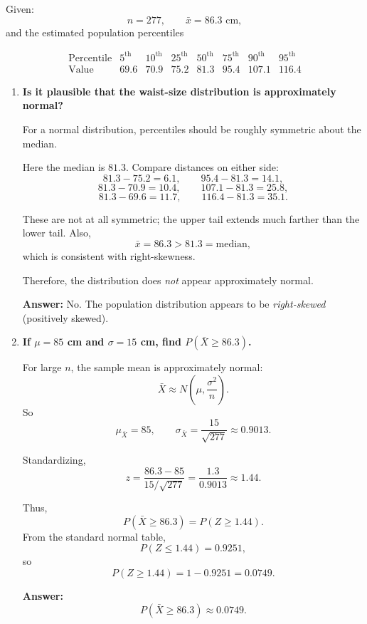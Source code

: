 Given:
\[
n=277,\qquad \bar{x}=86.3\text{ cm},
\]
and the estimated population percentiles

\[
\begin{array}{c|ccccccc}
\text{Percentile} & 5^\text{th} & 10^\text{th} & 25^\text{th} & 50^\text{th} & 75^\text{th} & 90^\text{th} & 95^\text{th}\\
\hline
\text{Value} & 69.6 & 70.9 & 75.2 & 81.3 & 95.4 & 107.1 & 116.4
\end{array}
\]

\begin{enumerate}
    \item[(a)] \textbf{Is it plausible that the waist-size distribution is approximately normal?}

    For a normal distribution, percentiles should be roughly symmetric about the median.

    Here the median is $81.3$. Compare distances on either side:
    \[
    81.3-75.2=6.1,\qquad 95.4-81.3=14.1,
    \]
    \[
    81.3-70.9=10.4,\qquad 107.1-81.3=25.8,
    \]
    \[
    81.3-69.6=11.7,\qquad 116.4-81.3=35.1.
    \]

    These are not at all symmetric; the upper tail extends much farther than the lower tail. Also,
    \[
    \bar{x}=86.3 > 81.3=\text{median},
    \]
    which is consistent with right-skewness.

    Therefore, the distribution does \emph{not} appear approximately normal.

    \textbf{Answer:} No. The population distribution appears to be \emph{right-skewed} (positively skewed).

    \item[(b)] \textbf{If $\mu=85$ cm and $\sigma=15$ cm, find $P(\bar{X}\ge 86.3)$.}

    For large $n$, the sample mean is approximately normal:
    \[
    \bar{X}\approx N\left(\mu,\frac{\sigma^2}{n}\right).
    \]
    So
    \[
    \mu_{\bar{X}}=85,\qquad \sigma_{\bar{X}}=\frac{15}{\sqrt{277}}\approx 0.9013.
    \]

    Standardizing,
    \[
    z=\frac{86.3-85}{15/\sqrt{277}}
    =\frac{1.3}{0.9013}\approx 1.44.
    \]

    Thus,
    \[
    P(\bar{X}\ge 86.3)=P(Z\ge 1.44).
    \]
    From the standard normal table,
    \[
    P(Z\le 1.44)=0.9251,
    \]
    so
    \[
    P(Z\ge 1.44)=1-0.9251=0.0749.
    \]

    \textbf{Answer:}
    \[
    P(\bar{X}\ge 86.3)\approx 0.0749.
    \]


\end{enumerate}
